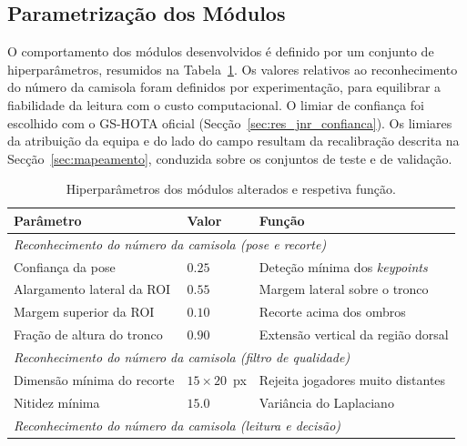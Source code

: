 \subsection{Parametrização dos Módulos}

O comportamento dos módulos desenvolvidos é definido por um conjunto de hiperparâmetros, resumidos na Tabela~\ref{tab:hiperparametros}. Os valores relativos ao reconhecimento do número da camisola foram definidos por experimentação, para equilibrar a fiabilidade da leitura com o custo computacional. O limiar de confiança foi escolhido com o GS-HOTA oficial (Secção~\ref{sec:res_jnr_confianca}). Os limiares da atribuição da equipa e do lado do campo resultam da recalibração descrita na Secção~\ref{sec:mapeamento}, conduzida sobre os conjuntos de teste e de validação.


\begin{table}[htbp]
    \centering
    \caption{Hiperparâmetros dos módulos alterados e respetiva função.}
    \label{tab:hiperparametros}
    \footnotesize
    \setlength{\tabcolsep}{4pt}
    \renewcommand{\arraystretch}{0.95}
    \begin{tabular}{|l|l|l|}
        \hline
        \textbf{Parâmetro} & \textbf{Valor} & \textbf{Função} \\
        \hline
        \multicolumn{3}{|l|}{\emph{Reconhecimento do número da camisola (pose e recorte)}} \\
        \hline
        Confiança da pose            & $0.25$          & Deteção mínima dos \emph{keypoints} \\
        \hline
        Alargamento lateral da ROI   & $0.55$          & Margem lateral sobre o tronco \\
        \hline
        Margem superior da ROI       & $0.10$          & Recorte acima dos ombros \\
        \hline
        Fração de altura do tronco   & $0.90$          & Extensão vertical da região dorsal \\
        \hline
        \multicolumn{3}{|l|}{\emph{Reconhecimento do número da camisola (filtro de qualidade)}} \\
        \hline
        Dimensão mínima do recorte   & $15\times20$~px & Rejeita jogadores muito distantes \\
        \hline
        Nitidez mínima               & $15.0$          & Variância do Laplaciano \\
        \hline
        \multicolumn{3}{|l|}{\emph{Reconhecimento do número da camisola (leitura e decisão)}} \\

\end{tabular}
\end{table}
